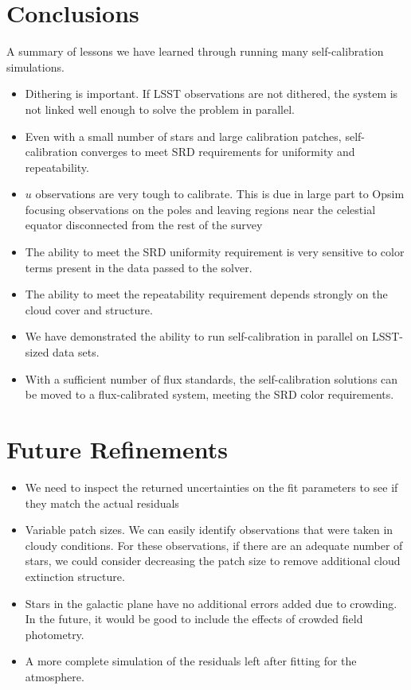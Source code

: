 \documentclass[12pt,preprint]{aastex}
\begin{document}
\section{Conclusions}
A summary of lessons we have learned through running many self-calibration simulations.
\begin{itemize}
\item{Dithering is important.  If LSST observations are not dithered, the system is not linked well enough to solve the problem in parallel.}
\item{Even with a small number of stars and large calibration patches, self-calibration converges to meet SRD requirements for uniformity and repeatability.}
\item{$u$ observations are very tough to calibrate.  This is due in large part to Opsim focusing observations on the poles and leaving regions near the celestial equator disconnected from the rest of the survey}
\item{The ability to meet the SRD uniformity requirement is very sensitive to color terms present in the data passed to the solver.}
\item{The ability to meet the repeatability requirement depends strongly on the cloud cover and structure.  }
\item{We have demonstrated the ability to run self-calibration in parallel on LSST-sized data sets.}
\item{With a sufficient number of flux standards, the self-calibration solutions can be moved to a flux-calibrated system, meeting the SRD color requirements.}
\end{itemize}


\section{Future Refinements}
\begin{itemize}
\item{We need to inspect the returned uncertainties on the fit parameters to see if they match the actual residuals}
\item{Variable patch sizes.  We can easily identify observations that were taken in cloudy conditions.  For these observations, if there are an adequate number of stars, we could consider decreasing the patch size to remove additional cloud extinction structure.}
\item{Stars in the galactic plane have no additional errors added due to crowding.  In the future, it would be good to include the effects of crowded field photometry.  }
\item{A more complete simulation of the residuals left after fitting for the atmosphere.}
\end{itemize}



\end{document}
